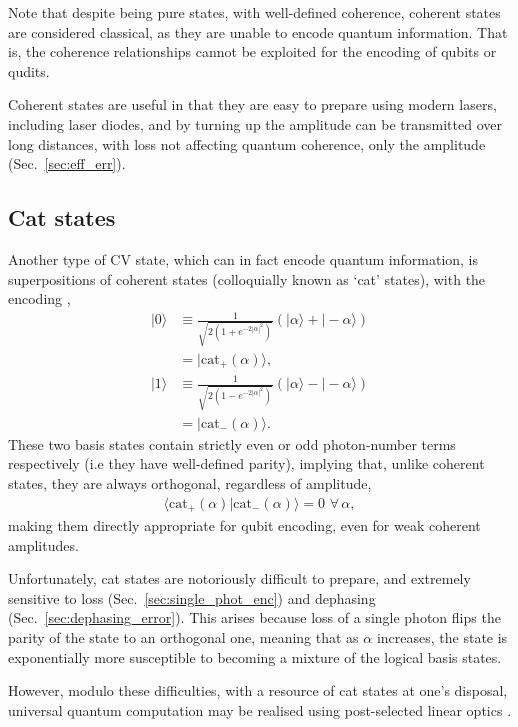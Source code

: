 \documentclass[aps, rmp, twocolumn, amsmath, amssymb, nofootinbib, superscriptaddress, longbibliography, floatfix, table-of-contents, eqsecnum]{revtex4-1}
\newcommand{\ket}[1]{|#1\rangle}
\begin{document}
Note that despite being pure states, with well-defined coherence, coherent states are considered classical, as they are unable to encode quantum information. That is, the coherence relationships cannot be exploited for the encoding of qubits or qudits.

Coherent states are useful in that they are easy to prepare using modern lasers, including laser diodes, and by turning up the amplitude can be transmitted over long distances, with loss not affecting quantum coherence, only the amplitude (Sec.~\ref{sec:eff_err}).

%
%

\subsection{Cat states} \label{sec:cat_enc} 

Another type of CV state, which can in fact encode quantum information, is superpositions of coherent states (colloquially known as `cat' states), with the encoding \cite{???},
\begin{align}
\ket{0} &\equiv \frac{1}{\sqrt{2(1+e^{-2|\alpha|^2})}} (\ket{\alpha}+\ket{-\alpha}) \nonumber \\
&= \ket{\text{cat}_+(\alpha)},\nonumber \\
\ket{1} &\equiv \frac{1}{\sqrt{2(1-e^{-2|\alpha|^2})}}(\ket{\alpha}-\ket{-\alpha}) \nonumber \\
&= \ket{\text{cat}_-(\alpha)}.
\end{align}
These two basis states contain strictly even or odd photon-number terms respectively (i.e they have well-defined parity), implying that, unlike coherent states, they are always orthogonal, regardless of amplitude,
\begin{align}
\langle\text{cat}_+(\alpha)|\text{cat}_-(\alpha)\rangle = 0 \,\,\forall\,\alpha,
\end{align}
making them directly appropriate for qubit encoding, even for weak coherent amplitudes.

Unfortunately, cat states are notoriously difficult to prepare, and extremely sensitive to loss (Sec.~\ref{sec:single_phot_enc}) and dephasing (Sec.~\ref{sec:dephasing_error}). This arises because loss of a single photon flips the parity of the state to an orthogonal one, meaning that as $\alpha$ increases, the state is exponentially more susceptible to becoming a mixture of the logical basis states.

However, modulo these difficulties, with a resource of cat states at one's disposal, universal quantum computation may be realised using post-selected linear optics \cite{bib:JeongRalph05, bib:Gilchrist04}.
\end{document}

